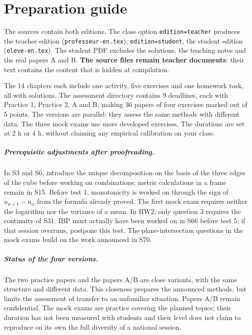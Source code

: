 \chapter*{Preparation guide}
\begin{teachernote}
The sources contain both editions. The class option \texttt{edition=teacher} produces the teacher edition (\texttt{professeur-en.tex}); \texttt{edition=student}, the student edition (\texttt{eleve-en.tex}). The student PDF excludes the solutions, the teaching notes and the real papers A and B. \textbf{The source files remain teacher documents}: their text contains the content that is hidden at compilation.
\end{teachernote}
The 14 chapters each include one activity, five exercises and one homework task, all with solutions. The assessment directory contains 9 deadlines, each with Practice 1, Practice 2, A and B, making 36 papers of four exercises marked out of 5 points. The versions are parallel: they assess the same methods with different data. The three mock exams use more developed exercises. The durations are set at 2 h or 4 h, without claiming any empirical calibration on your class.
\paragraph{Prerequisite adjustments after proofreading.} In S3 and S6, introduce the unique decomposition on the basis of the three edges of the cube before working on combinations; metric calculations in a frame remain in S15. Before test 1, monotonicity is worked on through the sign of $u_{n+1}-u_n$ from the formula already proved. The first mock exam requires neither the logarithm nor the variance of a mean. In HW2, only question 3 requires the continuity of S31. IBP must actually have been worked on in S66 before test 5; if that session overruns, postpone this test. The plane-intersection questions in the mock exams build on the work announced in S70.
\paragraph{Status of the four versions.} The two practice papers and the papers A/B are close variants, with the same structure and different data. This closeness prepares the announced methods, but limits the assessment of transfer to an unfamiliar situation. Papers A/B remain confidential. The mock exams are practice covering the planned topics; their duration has not been measured with students and their level does not claim to reproduce on its own the full diversity of a national session.
